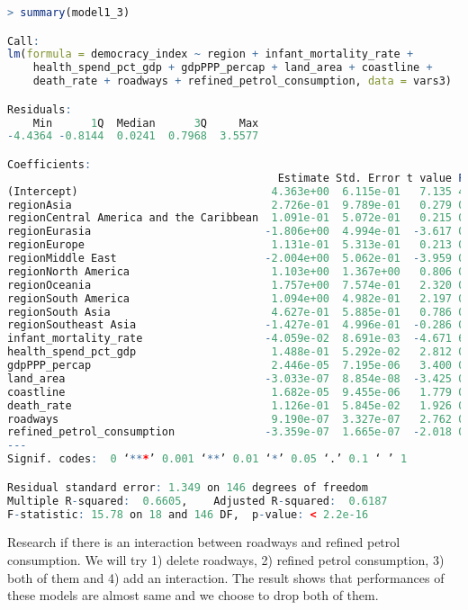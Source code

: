 \begin{lstlisting}[language=R, caption=Result of the model]
> summary(model1_3)

Call:
lm(formula = democracy_index ~ region + infant_mortality_rate + 
    health_spend_pct_gdp + gdpPPP_percap + land_area + coastline + 
    death_rate + roadways + refined_petrol_consumption, data = vars3)

Residuals:
    Min      1Q  Median      3Q     Max 
-4.4364 -0.8144  0.0241  0.7968  3.5577 

Coefficients:
                                          Estimate Std. Error t value Pr(>|t|)    
(Intercept)                              4.363e+00  6.115e-01   7.135 4.19e-11 ***
regionAsia                               2.726e-01  9.789e-01   0.279 0.781006    
regionCentral America and the Caribbean  1.091e-01  5.072e-01   0.215 0.830041    
regionEurasia                           -1.806e+00  4.994e-01  -3.617 0.000410 ***
regionEurope                             1.131e-01  5.313e-01   0.213 0.831701    
regionMiddle East                       -2.004e+00  5.062e-01  -3.959 0.000117 ***
regionNorth America                      1.103e+00  1.367e+00   0.806 0.421287    
regionOceania                            1.757e+00  7.574e-01   2.320 0.021732 *  
regionSouth America                      1.094e+00  4.982e-01   2.197 0.029599 *  
regionSouth Asia                         4.627e-01  5.885e-01   0.786 0.432974    
regionSoutheast Asia                    -1.427e-01  4.996e-01  -0.286 0.775534    
infant_mortality_rate                   -4.059e-02  8.691e-03  -4.671 6.75e-06 ***
health_spend_pct_gdp                     1.488e-01  5.292e-02   2.812 0.005599 ** 
gdpPPP_percap                            2.446e-05  7.195e-06   3.400 0.000869 ***
land_area                               -3.033e-07  8.854e-08  -3.425 0.000797 ***
coastline                                1.682e-05  9.455e-06   1.779 0.077401 .  
death_rate                               1.126e-01  5.845e-02   1.926 0.056064 .  
roadways                                 9.190e-07  3.327e-07   2.762 0.006483 ** 
refined_petrol_consumption              -3.359e-07  1.665e-07  -2.018 0.045461 *  
---
Signif. codes:  0 ‘***’ 0.001 ‘**’ 0.01 ‘*’ 0.05 ‘.’ 0.1 ‘ ’ 1

Residual standard error: 1.349 on 146 degrees of freedom
Multiple R-squared:  0.6605,	Adjusted R-squared:  0.6187 
F-statistic: 15.78 on 18 and 146 DF,  p-value: < 2.2e-16
\end{lstlisting}

Research if there is an interaction between roadways and refined petrol consumption. We will try 1) delete roadways, 2) refined petrol consumption, 3) both of them and 4) add an interaction. The result shows that performances of these models are almost same and we choose to drop both of them.

